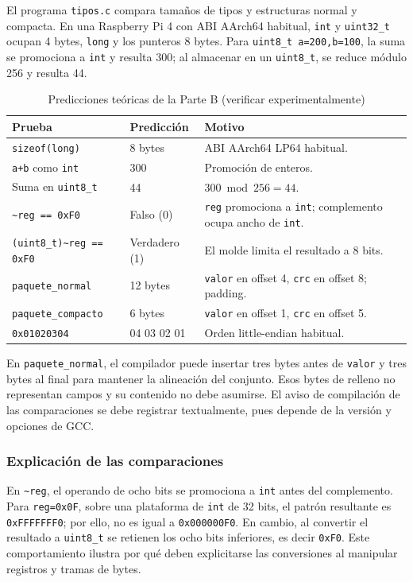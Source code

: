\documentclass[conference]{IEEEtran}
\begin{document}
El programa \texttt{tipos.c} compara tamaños de tipos y estructuras normal y compacta. En una Raspberry Pi 4 con ABI AArch64 habitual, \texttt{int} y \texttt{uint32\_t} ocupan 4 bytes, \texttt{long} y los punteros 8 bytes. Para \texttt{uint8\_t a=200,b=100}, la suma se promociona a \texttt{int} y resulta 300; al almacenar en un \texttt{uint8\_t}, se reduce módulo 256 y resulta 44.
\begin{table}[!htbp]\centering\caption{Predicciones teóricas de la Parte B (verificar experimentalmente)}\scriptsize
\begin{tabular}{|p{2.15cm}|p{1.35cm}|p{3.45cm}|}\hline
Prueba & Predicción & Motivo \\ \hline
\texttt{sizeof(long)} & 8 bytes & ABI AArch64 LP64 habitual. \\ \hline
\texttt{a+b} como \texttt{int} & 300 & Promoción de enteros. \\ \hline
Suma en \texttt{uint8\_t} & 44 & $300\bmod256=44$. \\ \hline
\texttt{\~{}reg == 0xF0} & Falso (0) & \texttt{reg} promociona a \texttt{int}; complemento ocupa ancho de \texttt{int}. \\ \hline
\texttt{(uint8\_t)\~{}reg == 0xF0} & Verdadero (1) & El molde limita el resultado a 8 bits. \\ \hline
\texttt{paquete\_normal} & 12 bytes & \texttt{valor} en offset 4, \texttt{crc} en offset 8; padding. \\ \hline
\texttt{paquete\_compacto} & 6 bytes & \texttt{valor} en offset 1, \texttt{crc} en offset 5. \\ \hline
\texttt{0x01020304} & 04 03 02 01 & Orden little-endian habitual. \\ \hline
\end{tabular}\end{table}
En \texttt{paquete\_normal}, el compilador puede insertar tres bytes antes de \texttt{valor} y tres bytes al final para mantener la alineación del conjunto. Esos bytes de relleno no representan campos y su contenido no debe asumirse. El aviso de compilación de las comparaciones se debe registrar textualmente, pues depende de la versión y opciones de GCC.
\subsubsection{Explicación de las comparaciones}
En \texttt{\~{}reg}, el operando de ocho bits se promociona a \texttt{int} antes del complemento. Para \texttt{reg=0x0F}, sobre una plataforma de \texttt{int} de 32 bits, el patrón resultante es \texttt{0xFFFFFFF0}; por ello, no es igual a \texttt{0x000000F0}. En cambio, al convertir el resultado a \texttt{uint8\_t} se retienen los ocho bits inferiores, es decir \texttt{0xF0}. Este comportamiento ilustra por qué deben explicitarse las conversiones al manipular registros y tramas de bytes.
\end{document}
